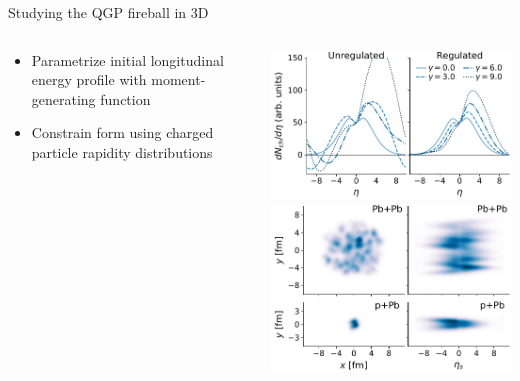 \documentclass{beamer}
\begin{document}
\begin{frame}{Studying the QGP fireball in 3D}
\begin{columns}
\begin{column}{.5\textwidth}
      \begin{itemize}
        \small
        \item Parametrize initial longitudinal energy profile with moment-generating function\\[1ex]
        \item Constrain form using charged particle rapidity distributions\\[1ex]
      \end{itemize}
    \end{column}
    \begin{column}{.5\textwidth}
      \begin{center}
        \includegraphics[width=.8\columnwidth]{regulate}\\[.5ex]
        \includegraphics[width=.9\columnwidth]{trento3d_example}
      \end{center}
    \end{column}
  \end{columns}
\end{frame}
\end{document}
